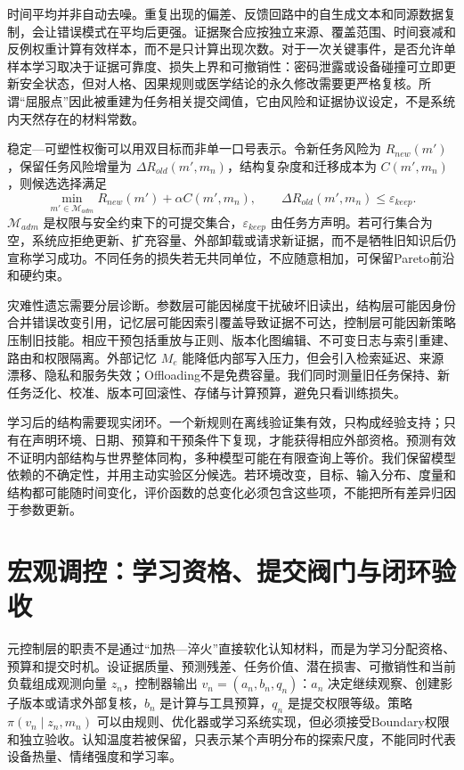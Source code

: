 时间平均并非自动去噪。重复出现的偏差、反馈回路中的自生成文本和同源数据复制，会让错误模式在平均后更强。证据聚合应按独立来源、覆盖范围、时间衰减和反例权重计算有效样本，而不是只计算出现次数。对于一次关键事件，是否允许单样本学习取决于证据可靠度、损失上界和可撤销性：密码泄露或设备碰撞可立即更新安全状态，但对人格、因果规则或医学结论的永久修改需要更严格复核。所谓“屈服点”因此被重建为任务相关提交阈值，它由风险和证据协议设定，不是系统内天然存在的材料常数。

稳定—可塑性权衡可以用双目标而非单一口号表示。令新任务风险为 $R_{new}(m')$，保留任务风险增量为 $\Delta R_{old}(m',m_n)$，结构复杂度和迁移成本为 $C(m',m_n)$，则候选选择满足
\[
\min_{m'\in\mathcal M_{adm}} R_{new}(m')+\alpha C(m',m_n),
\qquad
\Delta R_{old}(m',m_n)\leq\varepsilon_{keep}.
\]
$\mathcal M_{adm}$ 是权限与安全约束下的可提交集合，$\varepsilon_{keep}$ 由任务方声明。若可行集合为空，系统应拒绝更新、扩充容量、外部卸载或请求新证据，而不是牺牲旧知识后仍宣称学习成功。不同任务的损失若无共同单位，不应随意相加，可保留Pareto前沿和硬约束。

灾难性遗忘需要分层诊断。参数层可能因梯度干扰破坏旧读出，结构层可能因身份合并错误改变引用，记忆层可能因索引覆盖导致证据不可达，控制层可能因新策略压制旧技能。相应干预包括重放与正则、版本化图编辑、不可变日志与索引重建、路由和权限隔离。外部记忆 $M_e$ 能降低内部写入压力，但会引入检索延迟、来源漂移、隐私和服务失效；Offloading不是免费容量。我们同时测量旧任务保持、新任务泛化、校准、版本可回滚性、存储与计算预算，避免只看训练损失。

学习后的结构需要现实闭环。一个新规则在离线验证集有效，只构成经验支持；只有在声明环境、日期、预算和干预条件下复现，才能获得相应外部资格。预测有效不证明内部结构与世界整体同构，多种模型可能在有限查询上等价。我们保留模型依赖的不确定性，并用主动实验区分候选。若环境改变，目标、输入分布、度量和结构都可能随时间变化，评价函数的总变化必须包含这些项，不能把所有差异归因于参数更新。

\section{宏观调控：学习资格、提交阀门与闭环验收}
\label{sec:section_7393}

元控制层的职责不是通过“加热—淬火”直接软化认知材料，而是为学习分配资格、预算和提交时机。设证据质量、预测残差、任务价值、潜在损害、可撤销性和当前负载组成观测向量 $z_n$，控制器输出 $v_n=(a_n,b_n,q_n)$：$a_n$ 决定继续观察、创建影子版本或请求外部复核，$b_n$ 是计算与工具预算，$q_n$ 是提交权限等级。策略 $\pi(v_n\mid z_n,m_n)$ 可以由规则、优化器或学习系统实现，但必须接受Boundary权限和独立验收。认知温度若被保留，只表示某个声明分布的探索尺度，不能同时代表设备热量、情绪强度和学习率。

